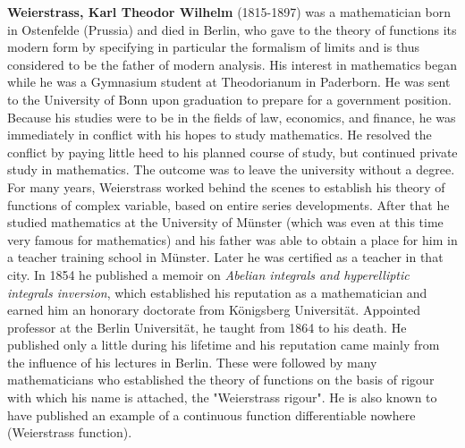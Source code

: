 \textbf{Weierstrass, Karl Theodor Wilhelm} (1815-1897) was a mathematician born in Ostenfelde (Prussia) and died in Berlin, who gave to the theory of functions its modern form by specifying in particular the formalism of limits and is thus considered to be the father of modern analysis. His interest in mathematics began while he was a Gymnasium student at Theodorianum in Paderborn. He was sent to the University of Bonn upon graduation to prepare for a government position. Because his studies were to be in the fields of law, economics, and finance, he was immediately in conflict with his hopes to study mathematics. He resolved the conflict by paying little heed to his planned course of study, but continued private study in mathematics. The outcome was to leave the university without a degree. For many years, Weierstrass worked behind the scenes to establish his theory of functions of complex variable, based on entire series developments. After that he studied mathematics at the University of Münster (which was even at this time very famous for mathematics) and his father was able to obtain a place for him in a teacher training school in Münster. Later he was certified as a teacher in that city. In 1854 he published a memoir on \textit{Abelian integrals and hyperelliptic integrals inversion}, which established his reputation as a mathematician and earned him an honorary doctorate from Königsberg Universität. Appointed professor at the Berlin Universität, he taught from 1864 to his death. He published only a little during his lifetime and his reputation came mainly from the influence of his lectures in Berlin. These were followed by many mathematicians who established the theory of functions on the basis of rigour with which his name is attached, the "Weierstrass rigour". He is also known to have published an example of a continuous function differentiable nowhere (Weierstrass function).


